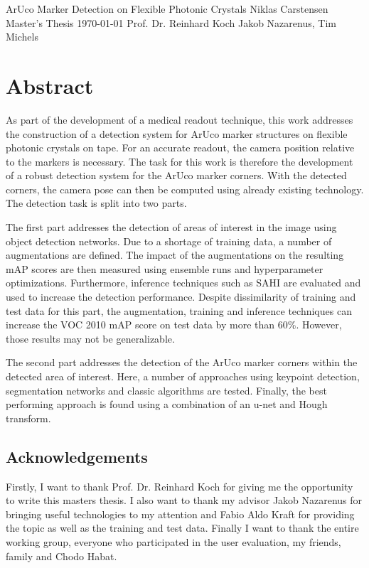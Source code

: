 \documentclass[10pt]{book}
\newcommand*\NewPage{\newpage\null\thispagestyle{empty}\newpage}
\begin{document}
\frontmatter

\studtitlepage%
{ArUco Marker Detection on Flexible Photonic Crystals}%
{}
{Niklas Carstensen}%
{Master's Thesis}%
{\today}%
{Prof. Dr. Reinhard Koch}%
{Jakob Nazarenus, Tim Michels}%
\NewPage{}
\setcounter{page}{2}
\studeidesstatt
\NewPage{}

\setcounter{page}{3}
\chapter*{Abstract}

As part of the development of a medical readout technique, this work addresses the construction of a detection system for \ac{ArUco} marker structures on flexible photonic crystals on tape. For an accurate readout, the camera position relative to the markers is necessary. The task for this work is therefore the development of a robust detection system for the \ac{ArUco} marker corners. With the detected corners, the camera pose can then be computed using already existing technology. The detection task is split into two parts. 

The first part addresses the detection of areas of interest in the image using object detection networks. Due to a shortage of training data, a number of augmentations are defined. 
The impact of the augmentations on the resulting \ac{mAP} scores are then measured using ensemble runs and hyperparameter optimizations. Furthermore, inference techniques such as \ac{SAHI} are evaluated and used to increase the detection performance. Despite dissimilarity of training and test data for this part, the augmentation, training and inference techniques can increase the VOC 2010 \ac{mAP} score on test data by more than 60\%. However, those results may not be generalizable.

The second part addresses the detection of the \ac{ArUco} marker corners within the detected area of interest. Here, a number of approaches using keypoint detection, segmentation networks and classic algorithms are tested. Finally, the best performing approach is found using a combination of an u-net and Hough transform.

\newpage
\section*{Acknowledgements}
Firstly, I want to thank Prof. Dr. Reinhard Koch for giving me the opportunity to write this masters thesis. I also want to thank my advisor Jakob Nazarenus for bringing useful technologies to my attention and Fabio Aldo Kraft for providing the topic as well as the training and test data. Finally I want to thank the entire working group, everyone who participated in the user evaluation, my friends, family and Chodo Habat.
\end{document}
